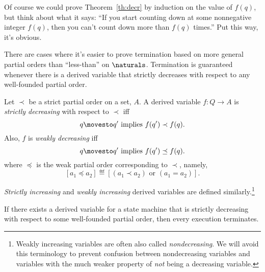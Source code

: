 Of course we could prove Theorem~\ref{th:decr} by induction on the value
of $f(q)$, but think about what it says: ``If you start counting down at
some nonnegative integer $f(q)$, then you can't count down more than
$f(q)$ times.''  Put this way, it's obvious.

There are cases where it's easier to prove termination based on more
general partial orders than ``less-than'' on $\naturals$.  Termination is
guaranteed whenever there is a derived variable that strictly decreases with
respect to any well-founded partial order.

\iffalse
We now define some other useful flavors of derived variables taking values
over partial ordered sets.  We'll use the notational convention that when
$\prec$ denotes a strict partial order on some set, then $\preceq$ is the
corresponding \emph{weak} partial order
\[
a\preceq a' \ \eqdef\quad a \prec a' \lor a = a'.
\]

A relation like $\prec$ is called a \emph{strict} partial order.  It is
transitive, antisymmetric, and but \emph{non}reflexive in the strongest
sense: $a \not\prec a$ for every $a \in A$.\footnote{In other words, if $a
\prec b$, then it is not the case that $b \prec a$.  This property is also
called \emph{a}symmetry.}\fi

\begin{definition}
Let $\prec$ be a strict partial order on a set, $A$.  A derived variable
$f : Q \to A$ is \emph{strictly decreasing} with respect to $\prec$ iff
\[
q \movesto q' \text{ implies } f(q') \prec f(q).
\]
Also, $f$ is \emph{weakly decreasing} iff
\[
q \movesto q' \text{  implies  } f(q') \preceq f(q).
\]
where $\preceq$ is the weak partial order corresponding to $\prec$,
namely,
\[
[a_1 \preceq a_2] \eqdef [(a_1 \prec a_2) \text{ or } (a_1=a_2)].
\]

\emph{Strictly increasing} and \emph{weakly increasing} derived variables
are defined similarly.\footnote{Weakly increasing variables are often also
called \emph{nondecreasing}.  We will avoid this terminology to prevent
confusion between nondecreasing variables and variables with the much
weaker property of \emph{not} being a decreasing variable.}
\end{definition}

\begin{theorem}\label{well-founded-decreasing}
  If there exists a derived variable for a state machine that is strictly
  decreasing with respect to some well-founded partial order, then every
  execution terminates.
\end{theorem}

